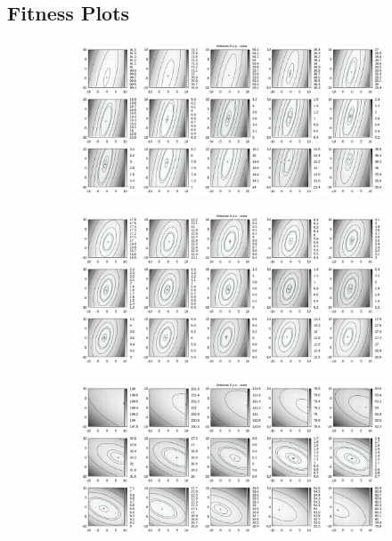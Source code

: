 \begin{appendix}
\chapter{Fitness Plots}
\label{app:fitness:plots1}
\newpage
\begin{figure}[!ht]
	\centering
	\begin{subfigure}[t]{0.3\textwidth}
	     \centering
	     \includegraphics[width=\textwidth]{img/fitness/xy/a0.png}
	\end{subfigure}
	\begin{subfigure}[t]{0.3\textwidth}
		\centering
	     \includegraphics[width=\textwidth]{img/fitness/xz/a0.png}
	\end{subfigure}
	\begin{subfigure}[t]{0.3\textwidth}
			\centering
	   \includegraphics[width=\textwidth]{img/fitness/yz/a0.png}

\end{subfigure}
\end{figure}
\end{appendix}
